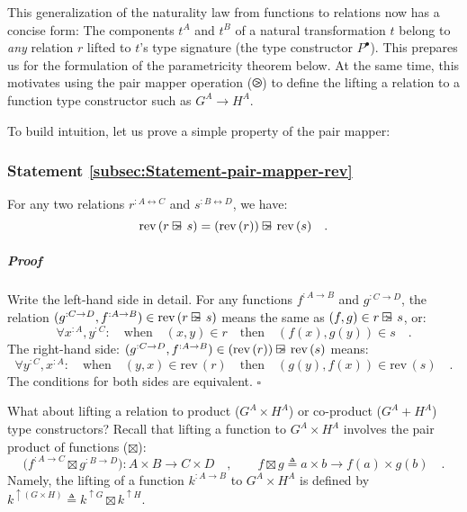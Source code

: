 This generalization of the naturality law from functions to relations
now has a concise form: The components $t^{A}$ and $t^{B}$ of a
natural transformation $t$ belong to \emph{any} relation $r$ lifted
to $t$\textsf{'}s type signature (the type constructor $P^{\bullet}$). This
prepares us for the formulation of the parametricity theorem below.
At the same time, this motivates using the pair mapper operation ($\ogreaterthan$)
to define the lifting a relation to a function type constructor such
as $G^{A}\rightarrow H^{A}$.

To build intuition, let us prove a simple property of the pair mapper:

\subsubsection{Statement \label{subsec:Statement-pair-mapper-rev}\ref{subsec:Statement-pair-mapper-rev}}

For any two relations $r^{:A\leftrightarrow C}$ and $s^{:B\leftrightarrow D}$,
we have:
\[
\text{rev}\,(r\varogreaterthan s)=(\text{rev}\,(r))\varogreaterthan\text{rev}\,(s)\quad.
\]


\subparagraph{Proof}

Write the left-hand side in detail. For any functions $f^{:A\rightarrow B}$
and $g^{:C\rightarrow D}$, the relation $(g^{:C\rightarrow D},f^{:A\rightarrow B})\in\text{rev}\,(r\varogreaterthan s)$
means the same as $(f,g)\in r\varogreaterthan s$, or:
\[
\forall x^{:A},y^{:C}:\quad\text{when}\quad(x,y)\in r\quad\text{then}\quad(f(x),g(y))\in s\quad.
\]
The right-hand side: $(g^{:C\rightarrow D},f^{:A\rightarrow B})\in(\text{rev}\,(r))\varogreaterthan\text{rev}\,(s)$
means:
\[
\forall y^{:C},x^{:A}:\quad\text{when}\quad(y,x)\in\text{rev}\,(r)\quad\text{then}\quad(g(y),f(x))\in\text{rev}\,(s)\quad.
\]
The conditions for both sides are equivalent. $\square$ 

What about lifting a relation to product ($G^{A}\times H^{A}$) or
co-product ($G^{A}+H^{A}$) type constructors? Recall that lifting
a function to $G^{A}\times H^{A}$ involves the pair product of functions
($\boxtimes$):
\[
\big(f^{:A\rightarrow C}\boxtimes g^{:B\rightarrow D}\big):A\times B\rightarrow C\times D\quad,\quad\quad f\boxtimes g\triangleq a\times b\rightarrow f(a)\times g(b)\quad.
\]
Namely, the lifting of a function $k^{:A\rightarrow B}$ to $G^{A}\times H^{A}$
is defined by $k^{\uparrow(G\times H)}\triangleq k^{\uparrow G}\boxtimes k^{\uparrow H}$. 

